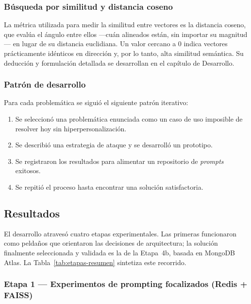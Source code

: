 \subsubsection{Búsqueda por similitud y distancia coseno}

La métrica utilizada para medir la similitud entre vectores es la distancia coseno, que evalúa el ángulo entre ellos —cuán alineados están, sin importar su magnitud— en lugar de su distancia euclidiana. Un valor cercano a 0 indica vectores prácticamente idénticos en dirección y, por lo tanto, alta similitud semántica. Su deducción y formulación detallada se desarrollan en el capítulo de Desarrollo.

\subsubsection{Patrón de desarrollo}

Para cada problemática se siguió el siguiente patrón iterativo:

\begin{enumerate}
	\item Se seleccionó una problemática enunciada como un caso de uso imposible de resolver hoy sin hiperpersonalización.
	\item Se describió una estrategia de ataque y se desarrolló un prototipo.
	\item Se registraron los resultados para alimentar un repositorio de \textit{prompts} exitosos.
	\item Se repitió el proceso hasta encontrar una solución satisfactoria.
\end{enumerate}

\subsection{Resultados}

El desarrollo atravesó cuatro etapas experimentales. Las primeras funcionaron como peldaños que orientaron las decisiones de arquitectura; la solución finalmente seleccionada y validada es la de la Etapa~4b, basada en MongoDB Atlas. La Tabla~\ref{tab:etapas-resumen} sintetiza este recorrido.

\subsubsection{Etapa 1 --- Experimentos de prompting focalizados (Redis + FAISS)}

